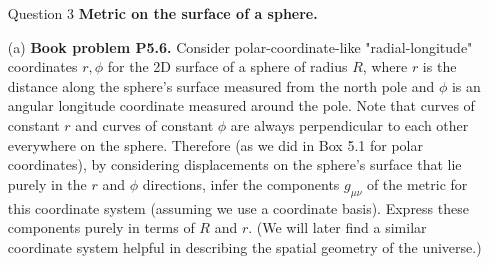 \documentclass[12pt]{article}
\begin{document}
\begin{enumerate}

    






  \newpage




















  \item[Question 3] \textbf{Metric on the surface of a sphere.}
  \item[(a)] \textbf{Book problem P5.6.} Consider polar-coordinate-like "radial-longitude" coordinates $r, \phi$ for the 2D surface of a sphere of radius $R$, where $r$ is the distance along the sphere's surface measured from the north pole and $\phi$ is an angular longitude coordinate measured around the pole. Note that curves of constant $r$ and curves of constant $\phi$ are always perpendicular to each other everywhere on the sphere. Therefore (as we did in Box 5.1 for polar coordinates), by considering displacements on the sphere's surface that lie purely in the $r$ and $\phi$ directions, infer the components $g_{\mu \nu}$ of the metric for this coordinate system (assuming we use a coordinate basis). Express these components purely in terms of $R$ and $r$. (We will later find a similar coordinate system helpful in describing the spatial geometry of the universe.)
  

\end{enumerate}
\end{document}
